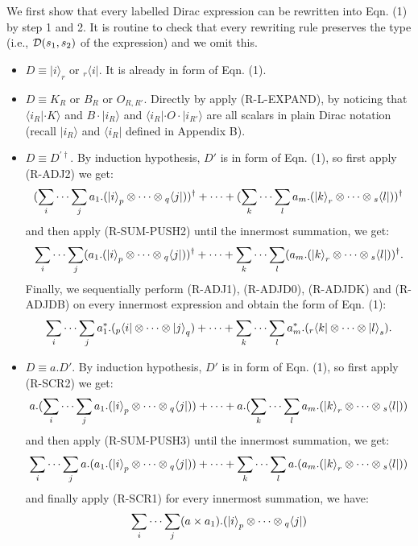 \documentclass[runningheads]{llncs}
\def\>{\ensuremath{\rangle}}
\def\<{\ensuremath{\langle}}
\begin{document}
We first show that every labelled Dirac expression can be rewritten into Eqn. (1) by step 1 and 2. It is routine to check that every rewriting rule preserves the type (i.e., ${\mathcal{D}}(s_1,s_2)$ of the expression) and we omit this.
\begin{itemize}
  \item $D \equiv |i\>_r$ or ${}_r\<i|$. It is already in form of Eqn. (1).
  \item $D \equiv K_R$ or $B_R$ or $O_{R,R'}$. Directly by apply (R-L-EXPAND), by noticing that $\<i_R|\cdot K\>$ and $B\cdot |i_R\>$ and $\<i_R|\cdot O \cdot |i_{R'}\>$ are all scalars in plain Dirac notation (recall $|i_R\>$ and $\<i_R|$ defined in Appendix B).
  \item $D \equiv D^{\prime\dagger}$. By induction hypothesis, $D'$ is in form of Eqn. (1), so first apply (R-ADJ2) we get:
  $$ 
  (\sum_{i}\cdots\sum_{j} a_1 . (\ket{i}_{p} \otimes \cdots \otimes {}_q\<j|))^\dagger
  + \cdots +
  (\sum_{k}\cdots\sum_{l} a_m . (\ket{k}_{r} \otimes \cdots \otimes {}_s\<l|))^\dagger$$
  and then apply (R-SUM-PUSH2) until the innermost summation, we get:
  $$ 
  \sum_{i}\cdots\sum_{j} (a_1 . (\ket{i}_{p} \otimes \cdots \otimes {}_q\<j|))^\dagger
  + \cdots +
  \sum_{k}\cdots\sum_{l} (a_m . (\ket{k}_{r} \otimes \cdots \otimes {}_s\<l|))^\dagger.$$
  Finally, we sequentially perform (R-ADJ1), (R-ADJD0), (R-ADJDK) and (R-ADJDB) on every innermost expression and obtain the form of Eqn. (1):
  $$ 
  \sum_{i}\cdots\sum_{j} a_1^* . ({}_p\<i| \otimes \cdots \otimes \ket{j}_q)
  + \cdots +
  \sum_{k}\cdots\sum_{l} a_m^* . ({}_r\<k| \otimes \cdots \otimes \ket{l}_s).$$
  \item $D \equiv a.D'$. By induction hypothesis, $D'$ is in form of Eqn. (1), so first apply (R-SCR2) we get:
  $$ 
  a.(\sum_{i}\cdots\sum_{j} a_1 . (\ket{i}_{p} \otimes \cdots \otimes {}_q\<j|))
  + \cdots +
  a.(\sum_{k}\cdots\sum_{l} a_m . (\ket{k}_{r} \otimes \cdots \otimes {}_s\<l|))$$
  and then apply (R-SUM-PUSH3) until the innermost summation, we get:
  $$ 
  \sum_{i}\cdots\sum_{j} a.(a_1 . (\ket{i}_{p} \otimes \cdots \otimes {}_q\<j|))
  + \cdots +
  \sum_{k}\cdots\sum_{l} a.(a_m . (\ket{k}_{r} \otimes \cdots \otimes {}_s\<l|))$$
  and finally apply (R-SCR1) for every innermost summation, we have:
  $$ 
  \sum_{i}\cdots\sum_{j} (a \times a_1) . (\ket{i}_{p} \otimes \cdots \otimes {}_q\<j|)
$$
\end{itemize}
\end{document}

